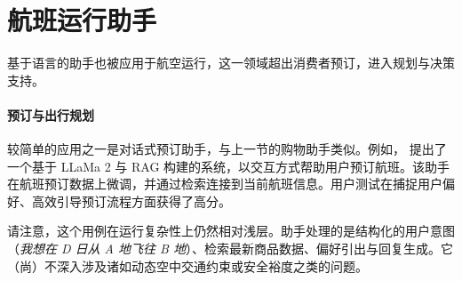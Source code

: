 



\section{航班运行助手}

基于语言的助手也被应用于航空运行，这一领域超出消费者预订，进入规划与决策支持。

\paragraph{预订与出行规划}
较简单的应用之一是对话式预订助手，与上一节的购物助手类似。例如，\citet{manasa2024towards} 提出了一个基于 LLaMa 2 与 RAG 构建的系统，以交互方式帮助用户预订航班。该助手在航班预订数据上微调，并通过检索连接到当前航班信息。用户测试在捕捉用户偏好、高效引导预订流程方面获得了高分。

请注意，这个用例在运行复杂性上仍然相对浅层。助手处理的是结构化的用户意图（{\em 我想在 D 日从 A 地飞往 B 地}）、检索最新商品数据、偏好引出与回复生成。它（尚）不深入涉及诸如动态空中交通约束或安全裕度之类的问题。

